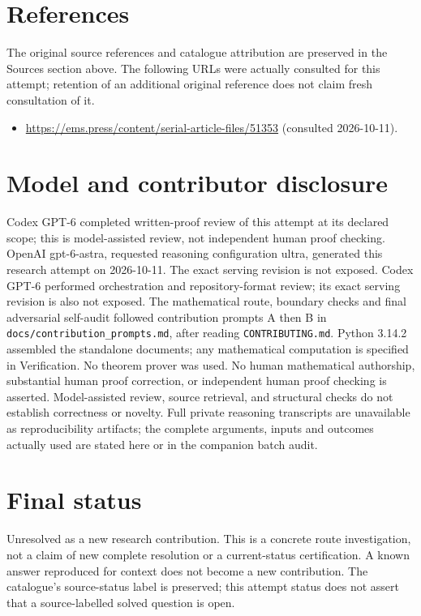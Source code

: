 \documentclass[11pt]{article}
\begin{document}
\section{References}
The original source references and catalogue attribution are preserved in the
Sources section above. The following URLs were actually consulted for this attempt;
retention of an additional original reference does not claim fresh consultation of it.
\begin{itemize}
\item \url{https://ems.press/content/serial-article-files/51353} (consulted 2026-10-11). 
\end{itemize}
\section{Model and contributor disclosure}
Codex GPT-6 completed written-proof review of this attempt at its declared scope; this is model-assisted review, not independent human proof checking.
OpenAI gpt-6-astra, requested reasoning configuration ultra, generated this research
attempt on 2026-10-11. The exact serving revision is not exposed. Codex GPT-6
performed orchestration and repository-format review; its exact serving revision
is also not exposed. The mathematical route, boundary checks and final adversarial
self-audit followed contribution prompts A then B in
\texttt{docs/contribution\_prompts.md}, after reading \texttt{CONTRIBUTING.md}.
Python 3.14.2 assembled the standalone documents; any mathematical computation is
specified in Verification. No theorem prover was used. No human mathematical
authorship, substantial human proof correction, or independent human proof checking
is asserted. Model-assisted review, source retrieval, and structural checks do not
establish correctness or novelty. Full private reasoning transcripts are unavailable
as reproducibility artifacts; the complete arguments, inputs and outcomes actually
used are stated here or in the companion batch audit.
\section{Final status}
Unresolved as a new research contribution. This is a concrete route investigation,
not a claim of new complete resolution or a current-status certification. A known
answer reproduced for context does not become a new contribution. The catalogue's
source-status label is preserved; this attempt status does not assert that a
source-labelled solved question is open.
\end{document}
